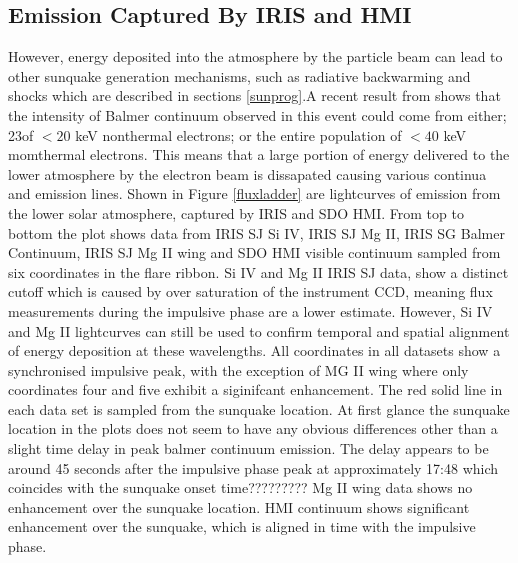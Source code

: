 \subsection{Emission Captured By IRIS and HMI}
However, energy deposited into the atmosphere by the particle beam can lead to other sunquake generation mechanisms, such as radiative backwarming and shocks which are described in sections \ref{sunprog}.A recent result from \cite{} shows that the intensity of Balmer continuum observed in this event could come from either; 23\percent of $<20$ keV nonthermal electrons; or the entire population of $<40$ keV momthermal electrons. This means that a large portion of energy delivered to the lower atmosphere by the electron beam is dissapated causing various continua and emission lines. Shown in Figure \ref{fluxladder} are lightcurves of emission from the lower solar atmosphere, captured by IRIS and SDO HMI. From top to bottom the plot shows data from IRIS SJ Si IV, IRIS SJ Mg II, IRIS SG Balmer Continuum, IRIS SJ Mg II wing and SDO HMI visible continuum sampled from six coordinates in the flare ribbon. Si IV and Mg II IRIS SJ data, show a distinct cutoff which is caused by over saturation of the instrument CCD, meaning flux measurements during the impulsive phase are a lower estimate. However, Si IV and Mg II lightcurves can still be used to confirm temporal and spatial alignment of energy deposition at these wavelengths. All coordinates in all datasets show a synchronised impulsive peak, with the exception of MG II wing where only coordinates four and five exhibit a siginifcant enhancement. The red solid line in each data set is sampled from the sunquake location. At first glance the sunquake location in the plots does not seem to have any obvious differences other than a slight time delay in peak balmer continuum emission. The delay appears to be around 45 seconds after the impulsive phase peak at approximately 17:48 which coincides with the sunquake onset time????????? Mg II wing data shows no enhancement over the sunquake location. HMI continuum shows significant enhancement over the sunquake, which is aligned in time with the impulsive phase. 




